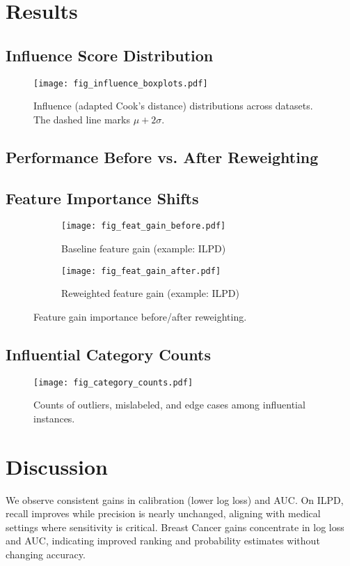 \documentclass[sn-basic]{sn-jnl} %
\begin{document}
\section{Results}
\subsection{Influence Score Distribution}
\begin{figure}[H]
  \centering
  \texttt{[image: fig\_influence\_boxplots.pdf]}%
  \caption{Influence (adapted Cook’s distance) distributions across datasets. The dashed line marks $\mu+2\sigma$.}
  \label{fig:influence}
\end{figure}

\subsection{Performance Before vs. After Reweighting}


\subsection{Feature Importance Shifts}
\begin{figure}[H]
  \centering
  \begin{subfigure}{.49\linewidth}
    \centering
    \texttt{[image: fig\_feat\_gain\_before.pdf]}%
    \caption{Baseline feature gain (example: ILPD)}
  \end{subfigure}\hfill
  \begin{subfigure}{.49\linewidth}
    \centering
    \texttt{[image: fig\_feat\_gain\_after.pdf]}%
    \caption{Reweighted feature gain (example: ILPD)}
  \end{subfigure}
  \caption{Feature gain importance before/after reweighting.}
  \label{fig:featgain}
\end{figure}

\subsection{Influential Category Counts}
\begin{figure}[H]
  \centering
  \texttt{[image: fig\_category\_counts.pdf]}%
  \caption{Counts of outliers, mislabeled, and edge cases among influential instances.}
  \label{fig:cats}
\end{figure}

\section{Discussion}
We observe consistent gains in calibration (lower log loss) and AUC. On ILPD, recall improves while precision is nearly unchanged, aligning with medical settings where sensitivity is critical. Breast Cancer gains concentrate in log loss and AUC, indicating improved ranking and probability estimates without changing accuracy.
\end{document}
